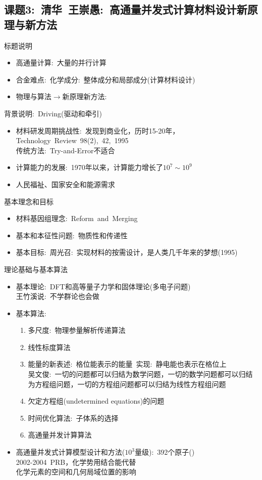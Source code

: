 \documentclass[10pt,a4paper]{article}
\begin{document}
\subsection{课题3:~清华~王崇愚:~高通量并发式计算材料设计新原理与新方法}
标题说明
\begin{itemize}
	\item 高通量计算:~大量的并行计算
	\item 合金难点:~化学成分:~整体成分和局部成分(计算材料设计)
	\item 物理与算法$\rightarrow$新原理新方法:~
\end{itemize}
背景说明:~Driving(驱动和牵引)
\begin{itemize}
	\item 材料研发周期挑战性:~发现到商业化，历时15-20年， \textrm{Technology~Review~98(2),~42,~1995}\\
		传统方法:~\textrm{Try-and-Error}不适合
	\item 计算能力的发展:~1970年以来，计算能力增长了$10^7\sim10^9$
	\item 人民福祉、国家安全和能源需求
\end{itemize}
基本理念和目标
\begin{itemize}
	\item 材料基因组理念:~\textrm{Reform~and~Merging}
	\item 基本和本征性问题:~物质性和传递性
	\item 基本目标:~周光召:~实现材料的按需设计，是人类几千年来的梦想(1995)
\end{itemize}
理论基础与基本算法
\begin{itemize}
	\item 基本理论:~\textrm{DFT}和高等量子力学和固体理论(多电子问题)\\
		王竹溪说:~不学群论也会做
	\item 基本算法:~
		\begin{enumerate}
			\item 多尺度:~物理参量解析传递算法
			\item 线性标度算法
			\item 能量的新表述:~格位能表示的能量~实现:~静电能也表示在格位上\\
			吴文俊:~一切的问题都可以归结为数学问题，一切的数学问题都可以归结为方程组问题，一切的方程组问题都可以归结为线性方程组问题
			\item 欠定方程组(undetermined equations)的问题
			\item 时间优化算法:~子体系的选择
			\item 高通量并发计算算法
		\end{enumerate}
	\item 高通量并发式计算模型设计和方法($10^3$量级):~392个原子()\\
		\textrm{2002-2004~PRB，化学势用结合能代替}\\
		化学元素的空间和几何局域位置的影响
\end{itemize}
\end{document}
